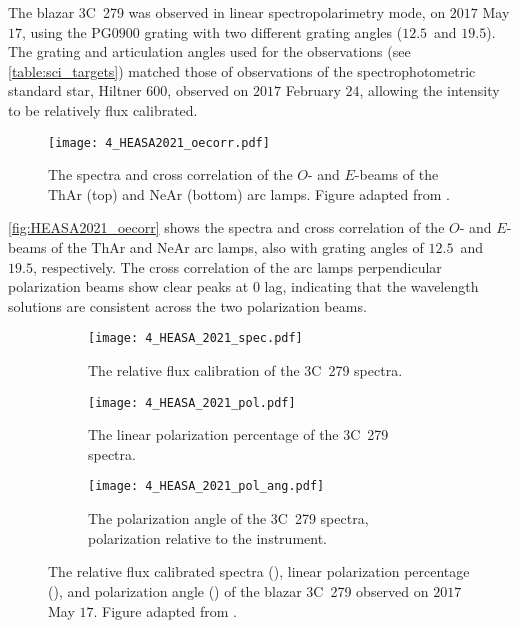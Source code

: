The blazar 3C~279 was observed in linear spectropolarimetry mode, on $2017$ May $17$, using the PG$0900$ grating with two different grating angles ($12.5$\degree\ and $19.5$\degree).
The grating and articulation angles used for the observations (see \autoref{table:sci_targets}) matched those of observations of the spectrophotometric standard star, Hiltner $600$, observed on $2017$ February $24$, allowing the intensity to be relatively flux calibrated.

\begin{figure}[t]
    \centering
    \texttt{[image: 4\_HEASA2021\_oecorr.pdf]}
    \caption{The spectra and cross correlation of the $O$- and $E$-beams of the \gls{ThAr} (top) and \gls{NeAr} (bottom) arc lamps. Figure adapted from \citep{Cooper_HEASA2021}.}
    \label{fig:HEASA2021_oecorr}
\end{figure}

\autoref{fig:HEASA2021_oecorr} shows the spectra and cross correlation of the $O$- and $E$-beams of the \gls{ThAr} and \gls{NeAr} arc lamps, also with grating angles of $12.5$\degree\ and $19.5$\degree, respectively.
The cross correlation of the arc lamps perpendicular polarization beams show clear peaks at $0$ lag, indicating that the wavelength solutions are consistent across the two polarization beams.

\begin{figure}[t]
    \centering
    \begin{subfigure}[b]{1.0\textwidth}
        \centering
        \texttt{[image: 4\_HEASA\_2021\_spec.pdf]}
        \caption{The relative flux calibration of the 3C~279 spectra.}
        \label{subfig:HEASA2021_spec}
    \end{subfigure}
    \hfill
    \begin{subfigure}[b]{1.0\textwidth}
        \centering
        \texttt{[image: 4\_HEASA\_2021\_pol.pdf]}
        \caption{The linear polarization percentage of the 3C~279 spectra.}
        \label{subfig:HEASA2021_pol}
    \end{subfigure}
    \hfill
    \begin{subfigure}[b]{1.0\textwidth}
        \centering
        \texttt{[image: 4\_HEASA\_2021\_pol\_ang.pdf]}
        \caption{The polarization angle of the 3C~279 spectra, polarization relative to the instrument.}
        \label{subfig:HEASA2021_pol_ang}
    \end{subfigure}
    \caption{The relative flux calibrated spectra (), linear polarization percentage (), and polarization angle () of the blazar 3C~279 observed on $2017$ May $17$. Figure adapted from \cite{Cooper_HEASA2021}.}
    \label{fig:HEASA2021}
\end{figure}

